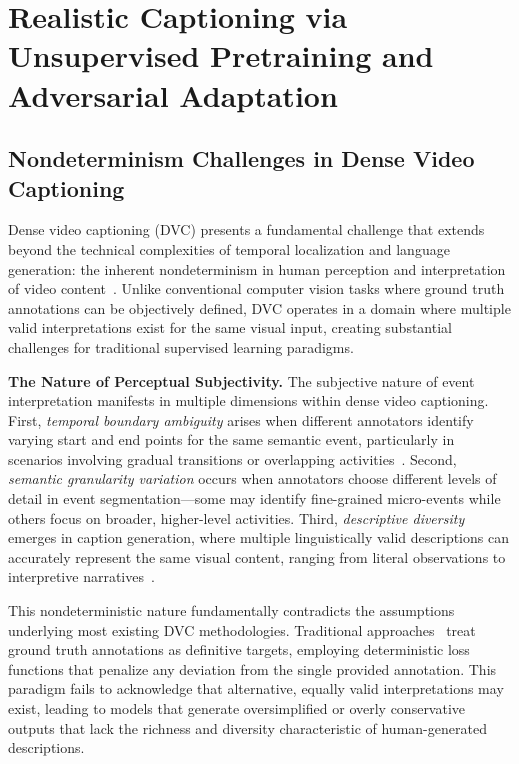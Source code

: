 
\chapter{Realistic Captioning via Unsupervised Pretraining and Adversarial Adaptation}
\label{chap:adversarial_pathway}

\section{Nondeterminism Challenges in Dense Video Captioning}

Dense video captioning (DVC) presents a fundamental challenge that extends beyond the technical complexities of temporal localization and language generation: the inherent nondeterminism in human perception and interpretation of video content~\cite{Krishna2017-pw,Fujita2020-ob}. Unlike conventional computer vision tasks where ground truth annotations can be objectively defined, DVC operates in a domain where multiple valid interpretations exist for the same visual input, creating substantial challenges for traditional supervised learning paradigms.

\textbf{The Nature of Perceptual Subjectivity.}
The subjective nature of event interpretation manifests in multiple dimensions within dense video captioning. First, \textit{temporal boundary ambiguity} arises when different annotators identify varying start and end points for the same semantic event, particularly in scenarios involving gradual transitions or overlapping activities~\cite{Summers2021-mz}. Second, \textit{semantic granularity variation} occurs when annotators choose different levels of detail in event segmentation—some may identify fine-grained micro-events while others focus on broader, higher-level activities. Third, \textit{descriptive diversity} emerges in caption generation, where multiple linguistically valid descriptions can accurately represent the same visual content, ranging from literal observations to interpretive narratives~\cite{Fujita2020-ob}.

This nondeterministic nature fundamentally contradicts the assumptions underlying most existing DVC methodologies. Traditional approaches~\cite{Li2018-ll,Wang2018-ap,Mun2019-ap} treat ground truth annotations as definitive targets, employing deterministic loss functions that penalize any deviation from the single provided annotation. This paradigm fails to acknowledge that alternative, equally valid interpretations may exist, leading to models that generate oversimplified or overly conservative outputs that lack the richness and diversity characteristic of human-generated descriptions.

